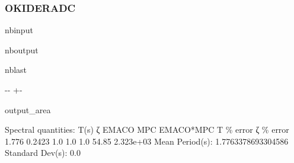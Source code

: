 \documentclass[letterpaper,10pt,english]{sphinxmanual}
\begin{document}
\subsubsection{OKID\sphinxhyphen{}ERA\sphinxhyphen{}DC}
\label{\detokenize{examples/01_SISO_Intro:OKID-ERA-DC}}
\begin{sphinxuseclass}{nbinput}
{
\begin{sphinxVerbatim}[commandchars=\\\{\}]
\llap{\color{nbsphinxin}[11]:\,\hspace{\fboxrule}\hspace{\fboxsep}}
  
\PYG{p}{[}\PYG{p}{]}       
\PYG{p}{[}\PYG{p}{]}\PYG{p}{[}\PYG{p}{]}  
\end{sphinxVerbatim}
}

\end{sphinxuseclass}
\begin{sphinxuseclass}{nboutput}
\begin{sphinxuseclass}{nblast}
{

\kern-\sphinxverbatimsmallskipamount\kern-\baselineskip
\kern+\FrameHeightAdjust\kern-\fboxrule
\vspace{\nbsphinxcodecellspacing}

\begin{sphinxuseclass}{output_area}
\begin{sphinxuseclass}{}


\begin{sphinxVerbatim}[commandchars=\\\{\}]
Spectral quantities:
       T(s)        ζ        EMACO      MPC       EMACO*MPC     T \% error    ζ \% error
      1.776      0.2423     1.0        1.0        1.0          54.85        2.323e+03
Mean Period(s): 1.7763378693304586
Standard Dev(s): 0.0
\end{sphinxVerbatim}



\end{sphinxuseclass}
\end{sphinxuseclass}
}

\end{sphinxuseclass}
\end{sphinxuseclass}
\end{document}
